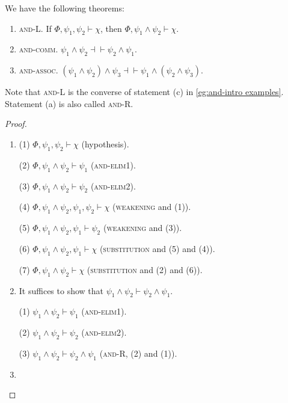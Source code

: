 \begin{theorem}
    We have the following theorems: 
    \begin{enumerate}[itemindent=0ex, itemsep=0pt, label=\upshape{(\alph*)}]
        \item \textup{\textsc{and-L}}. If $\Phi, \psi_1,\psi_2\vdash\chi$, then $\Phi, \psi_1\wedge\psi_2\vdash\chi$.
        \item \textup{\textsc{and-comm}}. $\psi_1\wedge\psi_2\dashv\vdash\psi_2\wedge\psi_1$.
        \item \textup{\textsc{and-assoc}}. $(\psi_1\wedge\psi_2)\wedge\psi_3\dashv\vdash\psi_1\wedge(\psi_2\wedge\psi_3)$.
    \end{enumerate}
\end{theorem}

Note that \textsc{and-L} is the converse of statement (c) in \cref{eg:and-intro examples}. Statement (a) is also called \textsc{and-R}. 

\begin{proof}
    \begin{enumerate}[itemindent=0ex, itemsep=0pt, label=\upshape{(\alph*)}]
        \item (1) $\Phi,\psi_1,\psi_2\vdash\chi$ (hypothesis). 
        
        (2) $\Phi, \psi_1\wedge\psi_2\vdash\psi_1$ (\textsc{and-elim1}). 
        
        (3) $\Phi, \psi_1\wedge\psi_2\vdash\psi_2$ (\textsc{and-elim2}). 
        
        (4) $\Phi,\psi_1\wedge\psi_2, \psi_1, \psi_2\vdash\chi$ (\textsc{weakening} and (1)). 
        
        (5) $\Phi, \psi_1\wedge\psi_2, \psi_1\vdash\psi_2$ (\textsc{weakening} and (3)). 
        
        (6) $\Phi, \psi_1\wedge\psi_2, \psi_1\vdash\chi$ (\textsc{substitution} and (5) and (4)). 
        
        (7) $\Phi, \psi_1\wedge\psi_2\vdash\chi$ (\textsc{substitution} and (2) and (6)).
        \item It suffices to show that $\psi_1\wedge\psi_2\vdash\psi_2\wedge\psi_1$. 

        (1) $\psi_1\wedge\psi_2\vdash\psi_1$ (\textsc{and-elim1}). 
        
        (2) $\psi_1\wedge\psi_2\vdash\psi_2$ (\textsc{and-elim2}). 
        
        (3) $\psi_1\wedge\psi_2\vdash\psi_2\wedge\psi_1$ (\textsc{and-R}, (2) and (1)).
        \item 
    \end{enumerate}
\end{proof}

